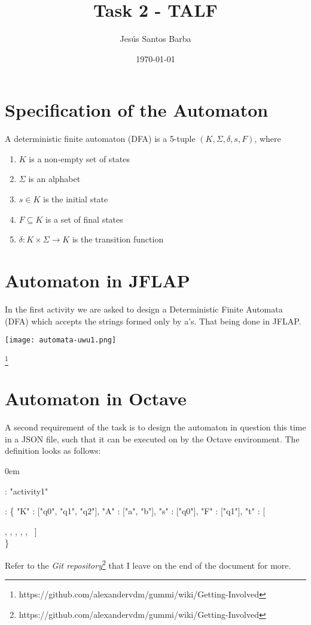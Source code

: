 \documentclass[11pt]{article}
\title{\textbf{Task 2 - TALF}}
\author{Jesús Santos Barba}
\date{\today}
\begin{document}
\maketitle
\thispagestyle{empty}

\section{Specification of the Automaton}

A deterministic finite automaton (DFA) is a 5-tuple $(K, \Sigma, \delta,s, F)$, where
\begin{enumerate}
\item $K$ is a non-empty set of states
\item $\Sigma$ is an alphabet
\item $s \in K$ is the initial state
\item $F \subseteq K$ is a set of final states
\item $\delta: K \times \Sigma \to K$ is the transition function 
\end{enumerate}

\section{Automaton in JFLAP}

In the first activity we are asked to design a Deterministic Finite Automata (DFA) which accepts the strings formed only by a's. That being done in JFLAP.
\begin{center}
	\texttt{[image: automata-uwu1.png]}
\end{center}

\footnote{https://github.com/alexandervdm/gummi/wiki/Getting-Involved}

\newpage
\section{Automaton in Octave}
A second requirement of the task is to design the automaton in question this time in a JSON file, such that it can be executed on by the Octave environment. The definition looks as follows:

\begin{description}
\addtolength{\itemindent}{0.80cm}
\itemsep0em 
\item["name"] : "activity1" 
\item["representation"] : \{
	\subitem "K" : ["q0", "q1", "q2"],
	\subitem "A" : ["a", "b"],
	\subitem "s" : ["q0"],
	\subitem "F" : ["q1"],
	\subitem "t" : [
	
\setlength\parindent{1.3cm}
			
			\subitem	["q0", "a", "q1"],
			\subitem	["q0", "b", "q2"],
			\subitem	["q1", "a", "q1"],
			\subitem	["q1", "b", "q2"],
			\subitem	["q2", "a", "q2"],
			\subitem	["q2", "b, "q2"]					
					\ ]
	\\	
\}

\end{description}

\setlength\parindent{0cm}

Refer to the \emph{Git repository}\footnote{https://github.com/alexandervdm/gummi/wiki/Getting-Involved} that I leave on the end of the document for more.
\end{document}
